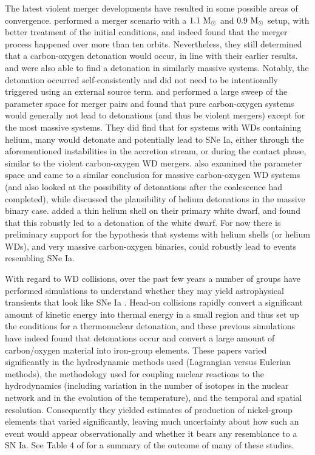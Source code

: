 \documentclass[12pt]{article}
\begin{document}
The latest violent merger developments have resulted in some possible areas of convergence.
\cite{pakmor:2012} performed a merger scenario
with a $1.1\ \mathrm{M}_\odot$ and $0.9\ \mathrm{M}_\odot$ setup, with better treatment
of the initial conditions, and indeed found that the merger process
happened over more than ten orbits. Nevertheless, they still determined
that a carbon-oxygen detonation would occur, in line with their
earlier results. \cite{moll:2014} and \cite{kashyap:2015} were also 
able to find a detonation in similarly massive systems. Notably,
the detonation occurred self-consistently and did not need to be  
intentionally triggered using an external source term.
\cite{dan:2012} and \cite{dan:2014} performed a large sweep 
of the parameter space for merger pairs and
found that pure carbon-oxygen systems would generally not lead to
detonations (and thus be violent mergers) except for the most massive
systems. They did find that for systems with WDs containing helium, many
would detonate and potentially lead to SNe Ia, either through the
aforementioned instabilities in the accretion stream, or during the
contact phase, similar to the violent carbon-oxygen WD
mergers. \cite{sato:2015} also examined the parameter space and
came to a similar conclusion for massive carbon-oxygen WD systems
(and also looked at the possibility of detonations after the
coalescence had completed), while \cite{tanikawa:2015} discussed
the plausibility of helium detonations in the massive binary case.
\cite{pakmor:2013} added a thin helium shell on their primary
white dwarf, and found that this robustly led to a detonation of the
white dwarf. For now there is preliminary support for the hypothesis
that systems with helium shells (or helium WDs), and very massive carbon-oxygen binaries,
could robustly lead to events resembling SNe Ia.

With regard to WD collisions, over the past few years a number of groups have performed simulations
to understand whether they may yield astrophysical transients that look like SNe Ia
\citep{rosswog:2009,raskin:2010,loren-aguilar:2010,hawley:2012,garcia-senz:2013,
kushnir:2013,papish:2015,holcomb:2015}. Head-on collisions rapidly convert a significant
amount of kinetic energy into thermal energy in a small region and thus set up the
conditions for a thermonuclear detonation, and these previous simulations have indeed
found that detonations occur and convert a large amount of carbon/oxygen material into
iron-group elements. These papers varied significantly in the hydrodynamic methods used
(Lagrangian versus Eulerian methods), the methodology used for coupling nuclear
reactions to the hydrodynamics (including variation in the number of isotopes in
the nuclear network and in the evolution of the temperature), and the temporal and
spatial resolution. Consequently they yielded estimates of production of nickel-group
elements that varied significantly, leaving much uncertainty about how such an event
would appear observationally and whether it bears any resemblance to a SN Ia.
See Table 4 of \cite{garcia-senz:2013} for a summary of the outcome of many of these studies.
\end{document}
